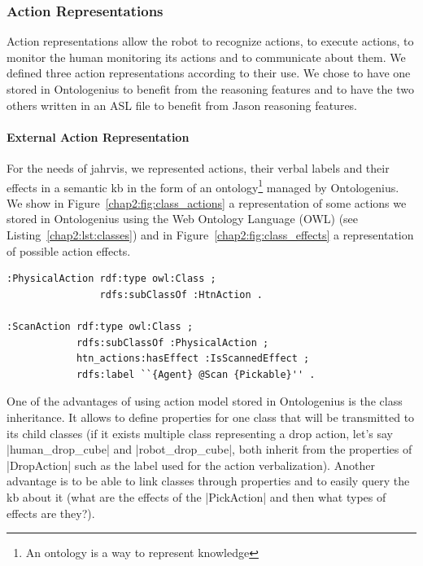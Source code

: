 \documentclass[a4paper,11pt,twoside]{StyleThese}
\begin{document}
\subsubsection{Action Representations}\label{chap2:subsubsec:action_rep}
Action representations allow the robot to recognize actions, to execute actions, to monitor the human monitoring its actions and to communicate about them. We defined three action representations according to their use. We chose to have one stored in Ontologenius to benefit from the reasoning features and to have the two others written in an ASL file to benefit from Jason reasoning features.

\paragraph{External Action Representation}
For the needs of \acrshort{jahrvis}, we represented actions, their verbal labels and their effects in a semantic \acrshort{kb} in the form of an ontology\footnote{An ontology is a way to represent knowledge} managed by Ontologenius. We show in Figure~\ref{chap2:fig:class_actions} a representation of some actions we stored in Ontologenius using the Web Ontology Language (OWL) (see Listing~\ref{chap2:lst:classes}) and in Figure~\ref{chap2:fig:class_effects} a representation of possible action effects.

\begin{lstlisting}[style=OwlTurtle, label={chap2:lst:classes}, caption={Description of ontology classes in the OWL language using the Turle syntax.} ]
:PhysicalAction	rdf:type owl:Class ;
				rdfs:subClassOf :HtnAction .

:ScanAction	rdf:type owl:Class ;
			rdfs:subClassOf :PhysicalAction ;
			htn_actions:hasEffect :IsScannedEffect ;
			rdfs:label ``{Agent} @Scan {Pickable}'' .

\end{lstlisting}

One of the advantages of using action model stored in Ontologenius is the class inheritance. It allows to define properties for one class that will be transmitted to its child classes (\eg if it exists multiple class representing a drop action, let's say |human_drop_cube| and |robot_drop_cube|, both inherit from the properties of |DropAction| such as the label used for the action verbalization). Another advantage is to be able to link classes through properties and to easily query the \acrshort{kb} about it (\eg what are the effects of the |PickAction| and then what types of effects are they?).
\end{document}
